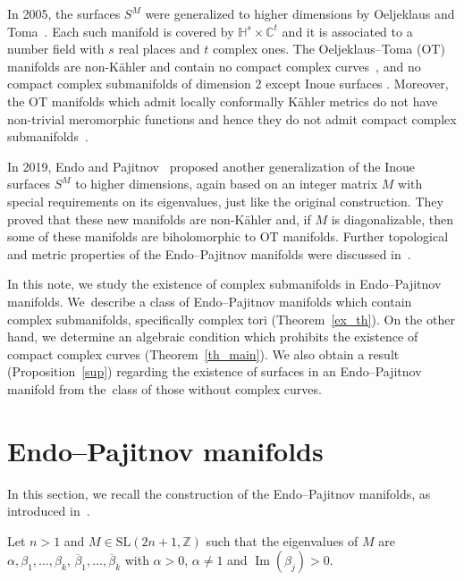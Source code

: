 \documentclass[pdftex]{sigma}
\newcommand{\C}{{\mathbb C}}
\renewcommand{\H}{{\mathbb H}}
\newcommand{\6}{\partial}
\renewcommand{\Im}{\operatorname{Im}}
\numberwithin{equation}{section}
\begin{document}
 In 2005, the surfaces $S^M$ were generalized to higher dimensions by Oeljeklaus and Toma~\cite{ot}. Each such manifold is covered by $\H^s\times \C^t$ and it is associated to a number field with $s$ real places and $t$ complex ones. The Oeljeklaus--Toma (OT) manifolds are non-K\"ahler and contain no compact complex curves~\cite{v_1}, and no compact complex submanifolds of dimension 2 except Inoue surfaces \cite{v_2}. Moreover, the OT manifolds which admit locally conformally K\"ahler metrics do not have non-trivial meromorphic functions and hence they do not admit compact complex submanifolds~\cite{ov}.

 In 2019, Endo and Pajitnov~\cite{pajitnov1} proposed another generalization of the Inoue surfaces $S^M$ to higher dimensions, again based on an integer matrix $M$ with special requirements on its eigenvalues, just like the original construction. They proved that these new manifolds are non-K\"ahler and, if $M$ is diagonalizable, then some of these manifolds are biholomorphic to OT manifolds. Further topological and metric properties of the Endo--Pajitnov manifolds were discussed in~\cite{cos}.

 In this note, we study the existence of complex submanifolds in Endo--Pajitnov manifolds. We~describe a class of Endo--Pajitnov manifolds which contain complex submanifolds, specifically complex tori (Theorem~\ref{ex_th}). On the other hand, we determine an algebraic condition which prohibits the existence of compact complex curves (Theorem~\ref{th_main}). We also obtain a result (Proposition~\ref{sup}) regarding the existence of surfaces in an Endo--Pajitnov manifold from the~class of those without complex curves.

\section{Endo--Pajitnov manifolds}
\label{EP_def_sec}

In this section, we recall the construction of the Endo--Pajitnov manifolds, as introduced in~\cite{pajitnov1}.

Let $n > 1$ and $M \in \textrm{SL}(2n+1, \mathbb{Z})$ such that the eigenvalues of $M$ are $\alpha, \beta_1, \dots, \beta_k$, $\overline{\beta}_1, \dots, \overline{\beta}_k$ with $\alpha>0$, $\alpha \neq 1$ and $\Im(\beta_j)>0$.
\end{document}
